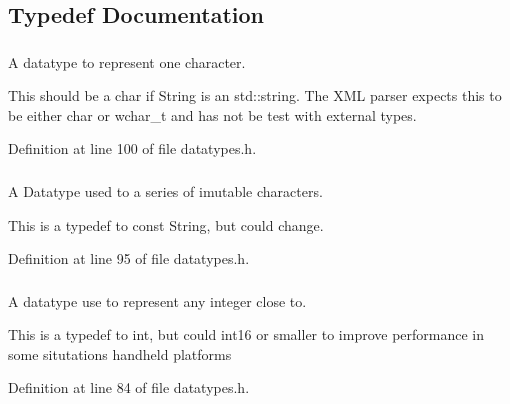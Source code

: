 \subsection{Typedef Documentation}
\hypertarget{namespacephys_a3098bae5b0a3cd16eec331f766cc562b}{
\subsubsection[{Character}]{}}
\label{df/dec/namespacephys_a3098bae5b0a3cd16eec331f766cc562b}


A datatype to represent one character. 

This should be a char if String is an std::string. The XML parser expects this to be either char or wchar\_\-t and has not be test with external types. 

Definition at line 100 of file datatypes.h.

\hypertarget{namespacephys_a5ce5049f8b4bf88d6413c47b504ebb31}{
\subsubsection[{ConstString}]{}}
\label{df/dec/namespacephys_a5ce5049f8b4bf88d6413c47b504ebb31}


A Datatype used to a series of imutable characters. 

This is a typedef to const String, but could change. 

Definition at line 95 of file datatypes.h.

\hypertarget{namespacephys_a7f09bf5585b2bb97613cd9aad4273a81}{
\subsubsection[{Integer}]{}}
\label{df/dec/namespacephys_a7f09bf5585b2bb97613cd9aad4273a81}


A datatype use to represent any integer close to. 

This is a typedef to int, but could int16 or smaller to improve performance in some situtations handheld platforms 

Definition at line 84 of file datatypes.h.

